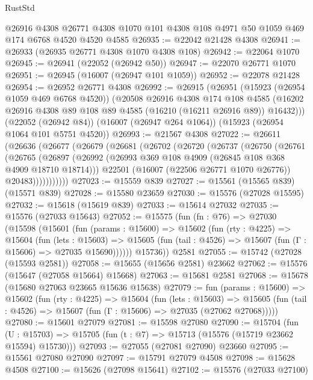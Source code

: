 \begin{lexlean}{RustStd}
\begin{coremodule}
    @26916
    @4308
    @26771
    @4308
    @1070
    @101
    @4308
    @108
    @4971
    @50
    @1059
    @469
    @174
    @6768
    @4520
    @4520
    @4585
@26935 := @22042 @21428 @4308
@26941 := @26933 (@26935 @26771 @4308 @1070 @4308 @108)
@26942 := @22064 @1070
@26945 := @26941 (@22052 (@26942 @50))
@26947 := @22070 @26771 @1070
@26951 := @26945 (@16007 (@26947 @101 @1059))
@26952 := @22078 @21428
@26954 := @26952 @26771 @4308
@26992 := @26915
    (@26951
      (@15923 (@26954 @1059 @469 @6768 @4520))
      (@20508
        @26916
        @4308
        @174
        @108
        @4585
        (@16202 @26916 @4308 @89 @108 @89 @4585 (@16210 (@16211 @26916 @89)) @16432)))
    (@22052 (@26942 @84))
    (@16007 (@26947 @264 @1064))
    (@15923 (@26954 @1064 @101 @5751 @4520))
@26993 := @21567 @4308
@27022 := @26611
    (@26636
      (@26677
        (@26679
          (@26681
            (@26702
              (@26720
                (@26737
                  (@26750
                    (@26761
                      (@26765
                        (@26897
                          (@26992 (@26993 @369 @108 @4909 (@26845 @108 @368 @4909 @18710 @18714)))
                          @22501
                          (@16007 (@22506 @26771 @1070 @26776))
                          @20483)))))))))))
@27023 := @15559 @839
@27027 := @15561 (@15565 @839) (@15571 @839)
@27028 := @15580 @23659
@27030 := @15576 (@27028 @15595)
@27032 := @15618 (@15619 @839)
@27033 := @15614 @27032
@27035 := @15576 (@27033 @15643)
@27052 := @15575
    (fun (fn : @76) =>
    @27030
      (@15598
        (@15601
          (fun (params : @15600) =>
          @15602
            (fun (rty : @4225) =>
            @15604
              (fun (lets : @15603) =>
              @15605 (fun (tail : @4526) => @15607 (fun (Γ : @15606) => @27035 @15690))))))
        @15736))
    @2581
@27055 := @15742 (@27028 (@15593 @2581))
@27058 := @15655 (@15656 @2581) @23662
@27062 := @15576 (@15647 (@27058 @15664) @15668)
@27063 := @15681 @2581
@27068 := @15678 (@15680 @27063 @23665 @15636 @15638)
@27079 := fun (params : @15600) =>
  @15602
    (fun (rty : @4225) =>
    @15604
      (fun (lets : @15603) =>
      @15605 (fun (tail : @4526) => @15607 (fun (Γ : @15606) => @27035 (@27062 @27068)))))
@27080 := @15601 @27079
@27081 := @15598 @27080
@27090 := @15704
    (fun (U : @15703) => @15705 (fun (t : @7) => @15713 (@15576 (@15719 @23662 @15594) @15730)))
@27093 := @27055 (@27081 @27090) @23660
@27095 := @15561 @27080 @27090
@27097 := @15791 @27079 @4508
@27098 := @15628 @4508
@27100 := @15626 (@27098 @15641)
@27102 := @15576 (@27033 @27100)

\end{coremodule}
\end{lexlean}

